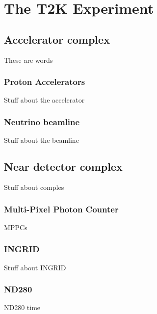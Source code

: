 


\chapter{The T2K Experiment}
\label{chap:T2KExperiment}


\section{Accelerator complex}
\label{sec:AcceleratorComplex}
These are words

\subsection{Proton Accelerators}
\label{subsec:ProtonAccelerators}
Stuff about the accelerator

\subsection{Neutrino beamline}
\label{subsec:NeutrinoBeamline}
Stuff about the beamline

\section{Near detector complex}
\label{sec:NearDetectorComplex}
Stuff about comples

\subsection{Multi-Pixel Photon Counter}
\label{subsec:MPPC}
MPPCs

\subsection{INGRID}
\label{subsec:INGRID}
Stuff about INGRID

\subsection{ND280}
\label{subsec:ND280}
ND280 time

